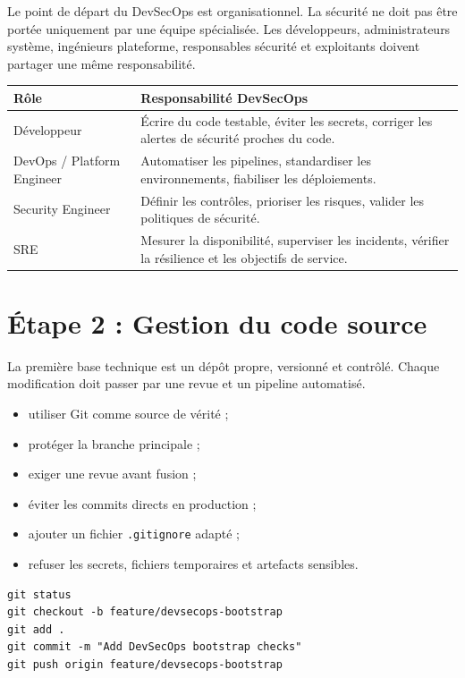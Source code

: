 \documentclass[12pt,a4paper]{article}
\begin{document}
Le point de départ du DevSecOps est organisationnel. La sécurité ne doit pas
être portée uniquement par une équipe spécialisée. Les développeurs,
administrateurs système, ingénieurs plateforme, responsables sécurité et
exploitants doivent partager une même responsabilité.

\begin{longtable}{|p{4cm}|p{9cm}|}
\hline
\textbf{Rôle} & \textbf{Responsabilité DevSecOps} \\
\hline
Développeur & Écrire du code testable, éviter les secrets, corriger les alertes
de sécurité proches du code. \\
\hline
DevOps / Platform Engineer & Automatiser les pipelines, standardiser les
environnements, fiabiliser les déploiements. \\
\hline
Security Engineer & Définir les contrôles, prioriser les risques, valider les
politiques de sécurité. \\
\hline
SRE & Mesurer la disponibilité, superviser les incidents, vérifier la résilience
et les objectifs de service. \\
\hline
\end{longtable}

\section{Étape 2 : Gestion du code source}

La première base technique est un dépôt propre, versionné et contrôlé. Chaque
modification doit passer par une revue et un pipeline automatisé.

\begin{itemize}[leftmargin=*]
  \item utiliser Git comme source de vérité ;
  \item protéger la branche principale ;
  \item exiger une revue avant fusion ;
  \item éviter les commits directs en production ;
  \item ajouter un fichier \texttt{.gitignore} adapté ;
  \item refuser les secrets, fichiers temporaires et artefacts sensibles.
\end{itemize}

\begin{lstlisting}[style=shellstyle,caption={Commandes Git de base}]
git status
git checkout -b feature/devsecops-bootstrap
git add .
git commit -m "Add DevSecOps bootstrap checks"
git push origin feature/devsecops-bootstrap
\end{lstlisting}
\end{document}
